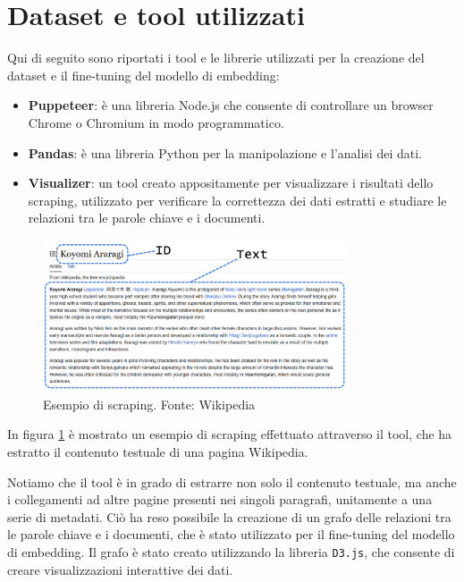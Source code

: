 \section{Dataset e tool utilizzati}
\label{sec:dataset}

Qui di seguito sono riportati i tool e le librerie
utilizzati per la creazione del dataset e il fine-tuning
del modello di embedding:

\begin{itemize}
      \item \textbf{Puppeteer}: è una libreria Node.js che consente di
            controllare un browser Chrome o Chromium in modo
            programmatico.
      \item \textbf{Pandas}: è una libreria Python per la manipolazione e
            l'analisi dei dati.
      \item \textbf{Visualizer}: un tool creato appositamente per
            visualizzare i risultati dello scraping, utilizzato per
            verificare la correttezza dei dati estratti e studiare le
            relazioni tra le parole chiave e i documenti.
\end{itemize}

\begin{figure}[H]
      \centering
      \includegraphics[width=0.8\textwidth]{res/scraper.png}
      \caption{Esempio di scraping. Fonte: Wikipedia}
      \label{fig:visualizer}
\end{figure}

In figura \ref{fig:visualizer} è mostrato un esempio di
scraping effettuato attraverso il tool, che ha estratto il
contenuto testuale di una pagina Wikipedia.

Notiamo che il tool è in grado di estrarre non solo il
contenuto testuale, ma anche i collegamenti ad altre pagine
presenti nei singoli paragrafi, unitamente a una serie di
metadati.
Ciò ha reso possibile la creazione di un grafo delle
relazioni tra le parole chiave e i documenti, che è stato
utilizzato per il fine-tuning del modello di embedding.
Il grafo è stato creato utilizzando la libreria
\texttt{D3.js}, che consente di creare visualizzazioni
interattive dei dati.

